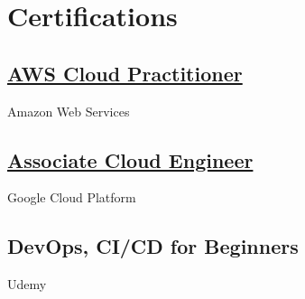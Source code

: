 \documentclass[]{plushcv}
\begin{document}
\begin{minipage}[t]{0.2\textwidth}

\section{Certifications}
\vspace{-0.375cm}
\subsection{{\href{https://www.credly.com/badges/945479a0-33e9-4c50-bffe-b7cccc3f298f/public_url}{AWS Cloud \newline Practitioner}}}
Amazon Web Services \\
\sectionsep
\subsection{{\href{https://www.credential.net/dfe60215-191b-46ff-980c-cfcabc1864c6}{Associate Cloud \newline Engineer}}}
Google Cloud Platform \\
\sectionsep
\subsection{DevOps, CI/CD for Beginners}
Udemy \\
\sectionsep
\sectionsep


\end{minipage}
\end{document}
